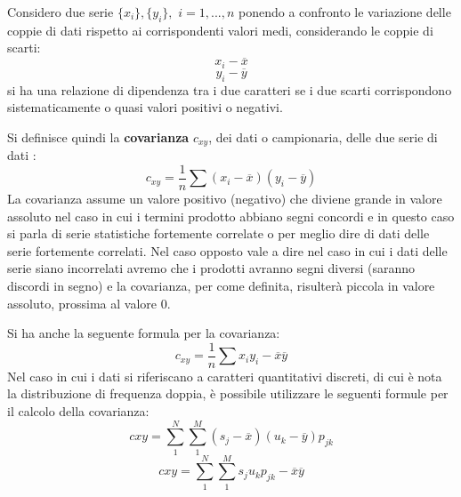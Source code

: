 \documentclass[a4paper,12pt, oneside]{book}
\begin{document}
Considero due serie $\{x_i\},\{y_i\},\,\,i=1,...,n$ ponendo a confronto le variazione delle coppie di dati
rispetto ai corrispondenti valori medi, considerando le coppie di scarti:
\[ x_i - \overline{x} \]
\[ y_i - \overline{y} \]
si ha una relazione di dipendenza tra i due caratteri se i due scarti corrispondono sistematicamente o quasi valori positivi o negativi.

Si definisce quindi la \textbf{covarianza} $c_{xy}$, dei dati o campionaria, delle due serie di dati :
\[ c_{xy} = \frac{1}{n} \sum (x_i - \overline{x}) (y_i - \overline{y}) \]
La covarianza assume un valore positivo (negativo) che diviene grande in valore assoluto nel caso in cui 
i termini prodotto abbiano segni concordi e in questo caso si parla di serie statistiche fortemente correlate
o per meglio dire di dati delle serie fortemente correlati.\newline
Nel caso opposto vale a dire nel caso in cui i dati delle serie siano incorrelati avremo che i prodotti
avranno segni diversi (saranno discordi in segno) e la covarianza, per come definita,
risulterà piccola in valore assoluto, prossima al valore 0.

Si ha anche la seguente formula per la covarianza:
\[ c_{xy} = \frac{1}{n} \sum x_iy_i - \overline{x}\overline{y} \]
Nel caso in cui i dati si riferiscano a caratteri quantitativi discreti, di cui è nota la
distribuzione di frequenza doppia, è possibile utilizzare le seguenti formule per il calcolo della covarianza:
\[ c{xy}=\sum_1^N\sum_1^M(s_j-\overline{x})(u_k-\overline{y})p_{jk} \]
\[c{xy}=\sum_1^N\sum_1^Ms_ju_kp_{jk}-\overline{x}\overline{y} \]
\end{document}
